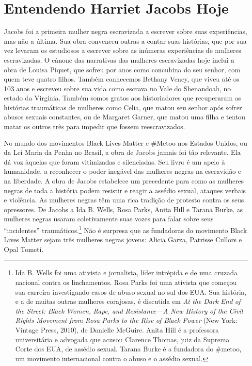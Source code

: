 \section{Entendendo Harriet Jacobs Hoje}

Jacobs foi a primeira mulher negra escravizada a escrever sobre suas
experiências, mas não a última. Sua obra convenceu outras a contar suas
histórias, que por sua vez levaram os estudiosos a escrever sobre as
inúmeras experiências de mulheres escravizadas. O cânone das narrativas
das mulheres escravizadas hoje inclui a obra de Louisa Piquet, que
sofreu por anos como concubina do seu senhor, com quem teve quatro
filhos. Também conhecemos Bethany Veney, que viveu até os 103 anos e
escreveu sobre sua vida como escrava no Vale do Shenandoah, no estado da
Virgínia. Também somos gratos aos historiadores que recuperaram as
histórias traumáticas de mulheres como Celia, que matou seu senhor após
sofrer abusos sexuais constantes, ou de Margaret Garner, que matou uma
filha e tentou matar os outros três para impedir que fossem
reescravizados.

No mundo dos movimentos Black Lives Matter e \#Metoo nos Estados Unidos,
ou da Lei Maria da Penha no Brasil, a obra de Jacobs jamais foi tão
relevante. Ela dá voz àquelas que foram vitimizadas e silenciadas. Seu
livro é um apelo à humanidade, a reconhecer o poder inegável das
mulheres negras na escravidão e na liberdade. A obra de Jacobs
estabelece um precedente para como as mulheres negras de toda a história
podem resistir e reagir a assédio sexual, ataques verbais e violência.
As mulheres negras têm uma rica tradição de protesto contra os seus
opressores. De Jacobs a Ida B. Wells, Rosa Parks, Anita Hill e Tarana
Burke, as mulheres negras usaram coletivamente suas vozes para falar
sobre seus ``incidentes'' traumáticos.\footnote{Ida B. Wells foi uma
  ativista e jornalista, líder intrépida e de uma cruzada nacional
  contra os linchamentos. Rosa Parks foi uma ativista que começou sua
  carreira investigando casos de abuso sexual no sul dos EUA. Sua
  história, e a de muitas outras mulheres corajosas, é discutida em
  \emph{At the Dark End of the Street: Black Women, Rape, and
  Resistance---A New History of the Civil Rights Movement from Rosa
  Parks to the Rise of Black Power} (New York: Vintage Press, 2010), de
  Danielle McGuire. Anita Hill é a professora universitária e advogada
  que acusou Clarence Thomas, juiz da Suprema Corte dos EUA, de assédio
  sexual. Tarana Burke é a fundadora do \#metoo, um movimento
  internacional contra o abuso e o assédio sexual.} Não é surpresa que
as fundadoras do movimento Black Lives Matter sejam três mulheres negras
jovens: Alicia Garza, Patrisse Cullors e Opal Tometi.

